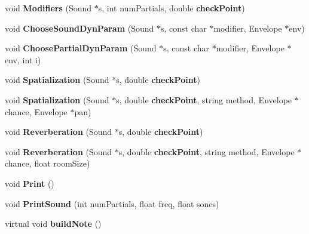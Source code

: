 \begin{CompactItemize}
void {\bf Modifiers} (Sound $\ast$s, int num\-Partials, double {\bf check\-Point})
\item 
void {\bf Choose\-Sound\-Dyn\-Param} (Sound $\ast$s, const  char $\ast$modifier, Envelope $\ast$env)
\item 
void {\bf Choose\-Partial\-Dyn\-Param} (Sound $\ast$s, const  char $\ast$modifier, Envelope $\ast$env, int i)
\item 
void {\bf Spatialization} (Sound $\ast$s, double {\bf check\-Point})
\item 
void {\bf Spatialization} (Sound $\ast$s, double {\bf check\-Point}, string method, Envelope $\ast$chance, Envelope $\ast$pan)
\item 
void {\bf Reverberation} (Sound $\ast$s, double {\bf check\-Point})
\item 
void {\bf Reverberation} (Sound $\ast$s, double {\bf check\-Point}, string method, Envelope $\ast$chance, float room\-Size)
\item 
void {\bf Print} ()
\item 
void {\bf Print\-Sound} (int num\-Partials, float freq, float sones)
\item 
virtual void {\bf build\-Note} ()
\end{CompactItemize}
